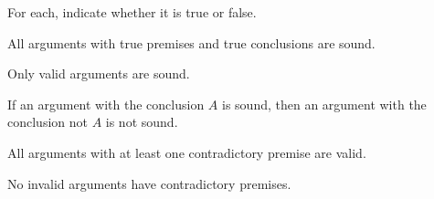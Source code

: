 \problempart
\label{hw1.A}
For each, indicate whether it is true or false.
	\begin{earg}
		\item All arguments with true premises and true conclusions are sound.
		\item Only valid arguments are sound.
		\item If an argument with the conclusion $A$ is sound, then an argument with the conclusion not $A$ is not sound.
		\item All arguments with at least one contradictory premise are valid.
		\item No invalid arguments have contradictory premises.
	\end{earg}
	
	\fi 

